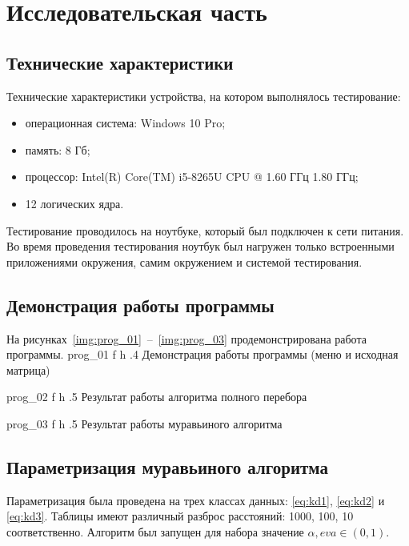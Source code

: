 \chapter{Исследовательская часть}

\section{Технические характеристики}
Технические характеристики устройства, на котором выполнялось тестирование:
\begin{itemize}
	\item операционная система: Windows 10 Pro;
	\item память: 8 Гб;
	\item процессор: Intel(R) Core(TM) i5-8265U CPU @ 1.60 ГГц 1.80 ГГц;
	\item 12 логических ядра.
\end{itemize}
Тестирование проводилось на ноутбуке, который был подключен к сети питания. 
Во время проведения тестирования ноутбук был нагружен только встроенными приложениями окружения, самим окружением и системой тестирования.

\newpage

\section{Демонстрация работы программы}
На рисунках~\ref{img:prog_01}~--~\ref{img:prog_03} продемонстрирована работа программы.
	{prog_01}
	{f}
	{h} 
	{.4\textwidth} 
	{Демонстрация работы программы (меню и исходная матрица)} 

	{prog_02}
	{f}
	{h} 
	{.5\textwidth} 
	{Результат работы алгоритма полного перебора} 

\newpage

	{prog_03}
	{f}
	{h} 
	{.5\textwidth} 
	{Результат работы муравьиного алгоритма} 
	

\section{Параметризация муравьиного алгоритма}
Параметризация была проведена на трех классах данных: \ref{eq:kd1}, \ref{eq:kd2} и \ref{eq:kd3}.
Таблицы имеют различный разброс расстояний: 1000, 100, 10 соответственно.
Алгоритм был запущен для набора значение $\alpha, eva \in (0, 1)$.

